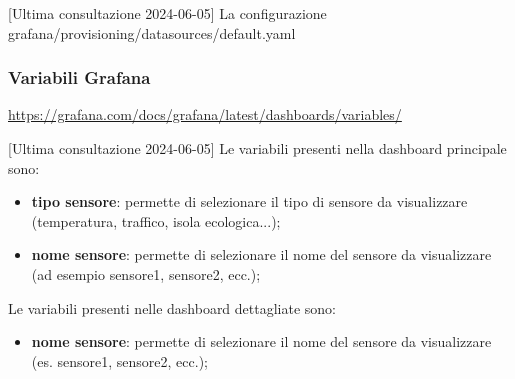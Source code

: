[Ultima consultazione 2024-06-05]
La configurazione  grafana/provisioning/datasources/default.yaml


\subsubsection{Variabili Grafana}
\url{https://grafana.com/docs/grafana/latest/dashboards/variables/}

[Ultima consultazione 2024-06-05]
Le variabili presenti nella dashboard principale sono:
\begin{itemize}
	\item \textbf{tipo sensore}: permette di selezionare il tipo di sensore da visualizzare (temperatura, traffico, isola ecologica...);
	\item \textbf{nome sensore}: permette di selezionare il nome del sensore da visualizzare (ad esempio sensore1, sensore2, ecc.); %
\end{itemize}
Le variabili presenti nelle dashboard dettagliate sono:
\begin{itemize}
	\item \textbf{nome sensore}: permette di selezionare il nome del sensore da visualizzare (es. sensore1, sensore2, ecc.);
\end{itemize}

